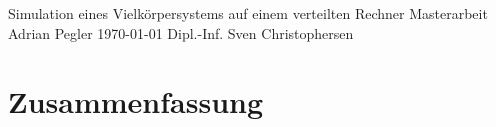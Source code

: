 \documentclass[10pt]{book}
\begin{document}
\frontmatter
  \thesistitlepage
    {Simulation eines Vielkörpersystems auf einem verteilten Rechner}
    {Masterarbeit}%
    {Adrian Pegler}%
    {\today}%
    {Dipl.-Inf. Sven Christophersen} %

  \eidesstatt{}

  \chapter*{Zusammenfassung}
    \blindtext

  \tableofcontents{}

\mainmatter









\end{document}
